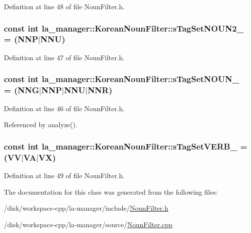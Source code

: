 Definition at line 48 of file NounFilter.h.\hypertarget{classla__manager_1_1KoreanNounFilter_c9e130d7190ad4b4b1034370b9b601f2}{
\subsubsection[{sTagSetNOUN2\_\-}]{\setlength{\rightskip}{0pt plus 5cm}const int {\bf la\_\-manager::KoreanNounFilter::sTagSetNOUN2\_\-} = (NNP$|$NNU)}}
\label{classla__manager_1_1KoreanNounFilter_c9e130d7190ad4b4b1034370b9b601f2}




Definition at line 47 of file NounFilter.h.\hypertarget{classla__manager_1_1KoreanNounFilter_39fcd85a5f34abb008ce24e7918f98ee}{
\subsubsection[{sTagSetNOUN\_\-}]{\setlength{\rightskip}{0pt plus 5cm}const int {\bf la\_\-manager::KoreanNounFilter::sTagSetNOUN\_\-} = (NNG$|$NNP$|$NNU$|$NNR)}}
\label{classla__manager_1_1KoreanNounFilter_39fcd85a5f34abb008ce24e7918f98ee}




Definition at line 46 of file NounFilter.h.

Referenced by analyze().\hypertarget{classla__manager_1_1KoreanNounFilter_a462e3d26dce41fdf7c40e84b5aaa842}{
\subsubsection[{sTagSetVERB\_\-}]{\setlength{\rightskip}{0pt plus 5cm}const int {\bf la\_\-manager::KoreanNounFilter::sTagSetVERB\_\-} = (VV$|$VA$|$VX)}}
\label{classla__manager_1_1KoreanNounFilter_a462e3d26dce41fdf7c40e84b5aaa842}




Definition at line 49 of file NounFilter.h.

The documentation for this class was generated from the following files:\begin{CompactItemize}
\item 
/disk/workspace-cpp/la-manager/include/\hyperlink{NounFilter_8h}{NounFilter.h}\item 
/disk/workspace-cpp/la-manager/source/\hyperlink{NounFilter_8cpp}{NounFilter.cpp}\end{CompactItemize}
